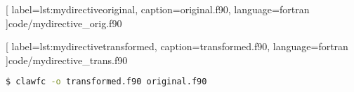 
  [
    label=lst:mydirectiveoriginal,
    caption=original.f90,
    language=fortran
  ]{code/mydirective_orig.f90}


  [
    label=lst:mydirectivetransformed,
    caption=transformed.f90,
    language=fortran
  ]{code/mydirective_trans.f90}

\begin{lstlisting}[label=lst:clawfcexample, caption=Call the compiler, language=bash]
$ clawfc -o transformed.f90 original.f90
\end{lstlisting}
